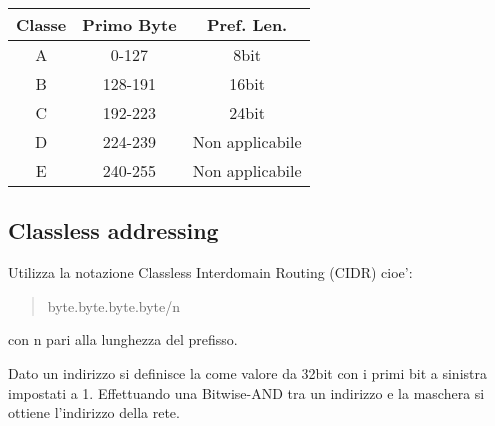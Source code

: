 \begin{tabular}{||c c c||}
    \hline
    Classe & Primo Byte & Pref. Len.\\
    \hline\hline
    A & 0-127 & 8bit\\
    B & 128-191 & 16bit\\
    C & 192-223 & 24bit\\
    D & 224-239 & Non applicabile\\
    E & 240-255 & Non applicabile\\
    \hline
\end{tabular}
\subsection{Classless addressing}
Utilizza la notazione Classless Interdomain Routing (CIDR) cioe':
\begin{quote}
    byte.byte.byte.byte/n
\end{quote}
con n pari alla lunghezza del prefisso.

Dato un indirizzo  si definisce la  come valore da 32bit con i primi  bit a sinistra impostati a 1.
Effettuando una Bitwise-AND tra un indirizzo e la maschera si ottiene l'indirizzo della rete.